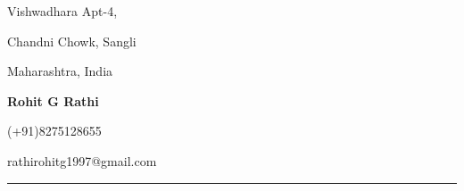 \documentclass[11pt]{article}
\begin{document}
	\begin{center}
		\begin{minipage}[b]{0.33333\textwidth}
			\raggedright
			Vishwadhara Apt-4,\par
			Chandni Chowk, Sangli\par
			Maharashtra, India
		\end{minipage}%
		\begin{minipage}[b]{0.33333\textwidth}
			\centering
			\begin{huge}
				\textbf{Rohit G Rathi}		
			\end{huge}
		\end{minipage}%
		\begin{minipage}[b]{0.33333\textwidth}
			\raggedleft
			(+91)8275128655\par
			rathirohitg1997@gmail.com
		\end{minipage}%
		\bigskip
		\hrule
		\bigskip
		\smallskip
		\begin{minipage}[t]{0.3\textwidth}
		\end{minipage}%
		\begin{minipage}[t]{0.4\textwidth}
			\centering
			\setlength{\fboxsep}{4pt}%
			\setlength{\fboxrule}{1pt}%
		\end{minipage}%
		\begin{minipage}[t]{0.3\textwidth}
		\end{minipage}%
	\end{center}
\end{document}
